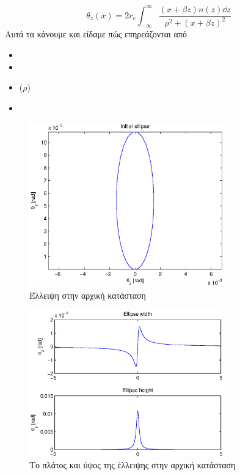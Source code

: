 		\begin{equation}
			\theta_z(x) = 2 r_e \int_{-\infty}^{\infty}\frac{(x+\beta z)n(z) \dd z}{\rho^2 + \left(x+\beta z \right) ^2}
		\end{equation}
		Αυτά τα κάνουμε  και είδαμε πώς επηρεάζονται από 
		\begin{itemize}
			\item {}
			\item {}
			\item {} ($\rho$) 
			\item {} 
		\end{itemize}   

\begin{figure}[tbh]
\includegraphics[width=0.75\textwidth]{figures/beam_deflection_script_01_initial_elipse}
\centering
\caption{Έλλειψη στην αρχική κατάσταση}
\label{fig:beam_deflection_script_01_initial_elipse}
\end{figure}

\begin{figure}[tbh]
\includegraphics[width=0.75\textwidth]{figures/beam_deflection_script_02_elipse_width}
\centering
\caption{Το πλάτος και ύψος της έλλειψης στην αρχική κατάσταση}
\label{fig:beam_deflection_script_02_elipse_width}
\end{figure}


